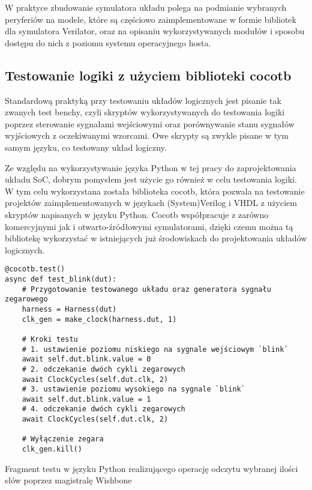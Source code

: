 W praktyce zbudowanie symulatora układu polega na podmianie wybranych peryferiów na modele, które są częściowo zaimplementowane w formie bibliotek dla symulatora Verilator, oraz na opisaniu wykorzystywanych modułów i sposobu dostępu do nich z poziomu systemu operacyjnego hosta.

\subsection{Testowanie logiki z użyciem biblioteki cocotb}

Standardową praktyką przy testowaniu układów logicznych jest pisanie tak zwanych test benchy, czyli skryptów wykorzystywanych do testowania logiki poprzez sterowanie sygnałami wejściowymi oraz porównywanie stanu sygnałów wyjściowych z oczekiwanymi wzorcami. Owe skrypty są zwykle pisane w tym samym języku, co testowany układ logiczny.

Ze względu na wykorzystywanie języka Python w tej pracy do zaprojektowania układu SoC, dobrym pomysłem jest użycie go również w celu testowania logiki. W tym celu wykorzystana została biblioteka cocotb, która pozwala na testowanie projektów zaimplementowanych w językach (System)Verilog i VHDL z użyciem skryptów napisanych w języku Python. Cocotb współpracuje z zarówno komercyjnymi jak i otwarto-źródłowymi symulatorami, dzięki czemu można tą bibliotekę wykorzystać w istniejących już środowiskach do projektowania układów logicznych.

\begin{listing}[H]
\begin{verbatim}
@cocotb.test()
async def test_blink(dut):
    # Przygotowanie testowanego układu oraz generatora sygnału zegarowego
    harness = Harness(dut)
    clk_gen = make_clock(harness.dut, 1)

    # Kroki testu
    # 1. ustawienie poziomu niskiego na sygnale wejściowym `blink`
    await self.dut.blink.value = 0
    # 2. odczekanie dwóch cykli zegarowych
    await ClockCycles(self.dut.clk, 2)
    # 3. ustawienie poziomu wysokiego na sygnale `blink`
    await self.dut.blink.value = 1
    # 4. odczekanie dwóch cykli zegarowych
    await ClockCycles(self.dut.clk, 2)

    # Wyłączenie zegara
    clk_gen.kill()
\end{verbatim}
\caption{\label{lst:tooling-sampletest}Fragment testu w języku Python realizującego operację odczytu wybranej ilości słów poprzez magistralę Wishbone}
\end{listing}

